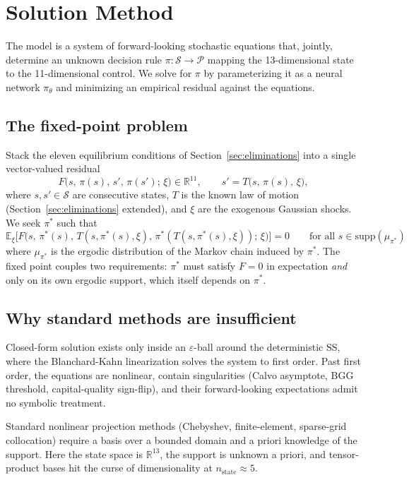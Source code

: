 \documentclass[11pt]{article}
\begin{document}
\section{Solution Method}
\label{sec:method}

The model is a system of forward-looking stochastic equations that,
jointly, determine an unknown decision rule
$\pi: \mathcal{S} \to \mathcal{P}$ mapping the 13-dimensional state to
the 11-dimensional control. We solve for $\pi$ by parameterizing it as
a neural network $\pi_\theta$ and minimizing an empirical residual
against the equations.

\subsection{The fixed-point problem}

Stack the eleven equilibrium conditions of Section~\ref{sec:eliminations}
into a single vector-valued residual
\[
F\big(s,\, \pi(s),\, s',\, \pi(s');\, \xi\big) \in \mathbb{R}^{11},
\qquad
s' = T\big(s,\, \pi(s),\, \xi\big),
\]
where $s, s' \in \mathcal{S}$ are consecutive states, $T$ is the known
law of motion (Section~\ref{sec:eliminations} extended), and $\xi$ are
the exogenous Gaussian shocks. We seek $\pi^*$ such that
\[
\mathbb{E}_\xi\Big[F\big(s,\, \pi^*(s),\, T(s, \pi^*(s), \xi),\, \pi^*(T(s, \pi^*(s), \xi));\, \xi\big)\Big] = 0
\qquad \text{for all } s \in \mathrm{supp}(\mu_{\pi^*})
\]
where $\mu_{\pi^*}$ is the ergodic distribution of the Markov chain
induced by $\pi^*$. The fixed point couples two requirements: $\pi^*$
must satisfy $F = 0$ in expectation \emph{and} only on its own ergodic
support, which itself depends on $\pi^*$.

\subsection{Why standard methods are insufficient}

Closed-form solution exists only inside an $\varepsilon$-ball around the
deterministic SS, where the Blanchard-Kahn linearization solves the
system to first order. Past first order, the equations are nonlinear,
contain singularities (Calvo asymptote, BGG threshold, capital-quality
sign-flip), and their forward-looking expectations admit no symbolic
treatment.

Standard nonlinear projection methods (Chebyshev, finite-element,
sparse-grid collocation) require a basis over a bounded domain and a
priori knowledge of the support. Here the state space is
$\mathbb{R}^{13}$, the support is unknown a priori, and tensor-product
bases hit the curse of dimensionality at $n_\text{state} \approx 5$.
\end{document}
